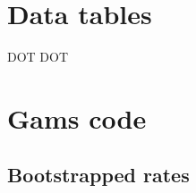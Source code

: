 
\section{Data tables\label{sec:appendixdata}}

DOT DOT

\section{Gams code\label{sec:appendixcode}}

\lstset{
	basicstyle=\footnotesize
}

\subsection{Bootstrapped rates}


